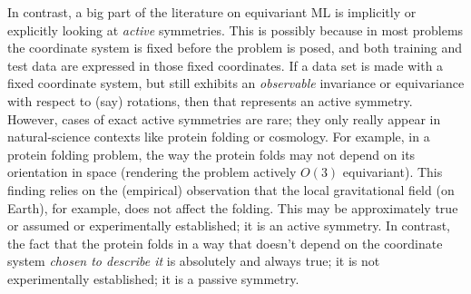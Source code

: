\documentclass{article} %
\begin{document}
In contrast, a big part of the literature on equivariant ML is implicitly or explicitly looking at \emph{active} symmetries.
This is possibly because in most problems the coordinate system is fixed before the problem is posed, and both training and test data are expressed in those fixed coordinates.
If a data set is made with a fixed coordinate system, but still exhibits an \emph{observable} invariance or equivariance with respect to (say) rotations, then that represents an active symmetry.
However, cases of exact active symmetries are rare; they only really appear in natural-science contexts like protein folding or cosmology.
For example, in a protein folding problem, the way the protein folds may not depend on its orientation in space (rendering the problem actively $O(3)$ equivariant).
This finding relies on the (empirical) observation that the local gravitational field (on Earth), for example, does not affect the folding.
This may be approximately true or assumed or experimentally established; it is an active symmetry.
In contrast, the fact that the protein folds in a way that doesn't depend on the coordinate system \emph{chosen to describe it} is absolutely and always true; it is not experimentally established; it is a passive symmetry.
\end{document}
